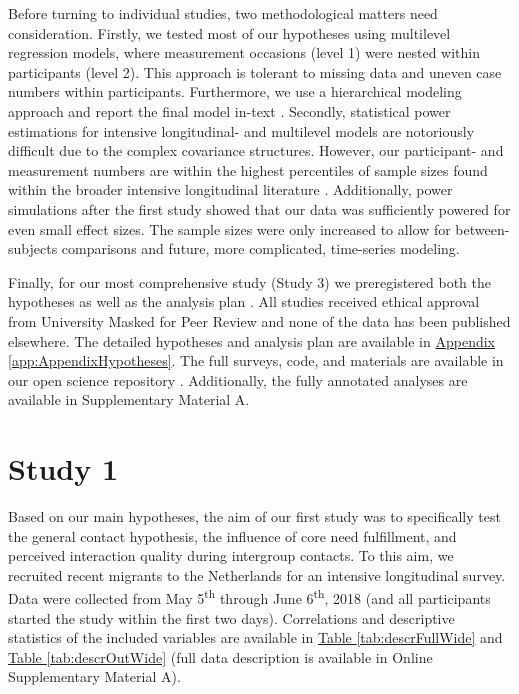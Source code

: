 \documentclass[man, 12pt, a4paper, mask]{apa7}
\theoremstyle{break}
\theoremstyle{plain}
\newcommand{\tblref}[2][]{\hyperref[#2]{Table \ref*{#2}#1}}
\newcommand{\appref}[2][]{\hyperref[#2]{Appendix \ref*{#2}#1}}
\begin{document}
Before turning to individual studies, two methodological matters need consideration. Firstly, we tested most of our hypotheses using multilevel regression models, where measurement occasions (level 1) were nested within participants (level 2). This approach is tolerant to missing data and uneven case numbers within participants. Furthermore, we use a hierarchical modeling approach and report the final model in-text \citep[][; for the full modeling process see Supplementary Material A]{Snijders2012}. Secondly, statistical power estimations for intensive longitudinal- and multilevel models are notoriously difficult due to the complex covariance structures. However, our participant- and measurement numbers are within the highest percentiles of sample sizes found within the broader intensive longitudinal literature \citep[e.g.,][]{AanhetRot2012}. Additionally, power simulations after the first study showed that our data was sufficiently powered for even small effect sizes. The sample sizes were only increased to allow for between-subjects comparisons and future, more complicated, time-series modeling.

Finally, for our most comprehensive study (Study 3) we preregistered both the hypotheses as well as the analysis plan \citep[available at][]{KreienkampMasked2021f}. All studies received ethical approval from University Masked for Peer Review and none of the data has been published elsewhere. The detailed hypotheses and analysis plan are available in \appref{app:AppendixHypotheses}. The full surveys, code, and materials are available in our open science repository \citep[including a complete codebook;][]{KreienkampMasked2022a}. Additionally, the fully annotated analyses are available in Supplementary Material A.

\section{Study 1}

Based on our main hypotheses, the aim of our first study was to
specifically test the general contact hypothesis, the influence of core
need fulfillment, and perceived interaction quality during intergroup
contacts. To this aim, we recruited recent migrants to the Netherlands
for an intensive longitudinal survey. Data were collected from May
5\textsuperscript{th} through June 6\textsuperscript{th}, 2018 (and all
participants started the study within the first two days). Correlations
and descriptive statistics of the included variables are available in
\tblref{tab:descrFullWide} and \tblref{tab:descrOutWide} (full data
description is available in Online Supplementary Material A).
\end{document}
